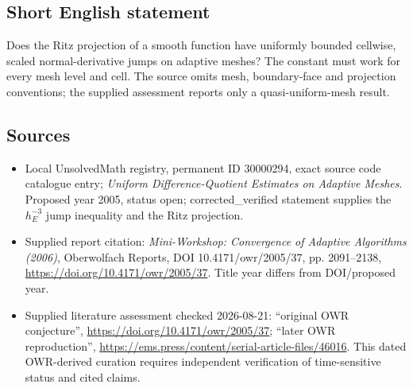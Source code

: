 \documentclass[11pt]{article}
\begin{document}
\subsection{Short English statement}
Does the Ritz projection of a smooth function have uniformly bounded cellwise, scaled normal-derivative jumps on adaptive meshes? The constant must work for every mesh level and cell. The source omits mesh, boundary-face and projection conventions; the supplied assessment reports only a quasi-uniform-mesh result.
\subsection{Sources}
\begin{itemize}
\item Local UnsolvedMath registry, permanent ID 30000294, exact source code catalogue entry; \emph{Uniform Difference-Quotient Estimates on Adaptive Meshes}. Proposed year 2005, status open; corrected\_verified statement supplies the $h_E^{-3}$ jump inequality and the Ritz projection.
\item Supplied report citation: \emph{Mini-Workshop: Convergence of Adaptive Algorithms (2006)}, Oberwolfach Reports, DOI 10.4171/owr/2005/37, pp. 2091--2138, \url{https://doi.org/10.4171/owr/2005/37}. Title year differs from DOI/proposed year.
\item Supplied literature assessment checked 2026-08-21: ``original OWR conjecture'', \url{https://doi.org/10.4171/owr/2005/37}; ``later OWR reproduction'', \url{https://ems.press/content/serial-article-files/46016}. This dated OWR-derived curation requires independent verification of time-sensitive status and cited claims.
\end{itemize}
\end{document}
